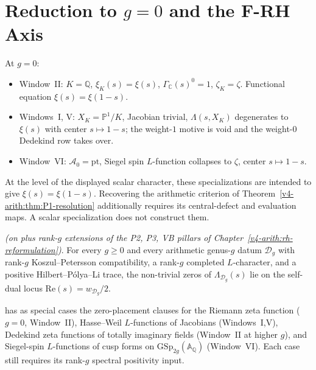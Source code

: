 \section{Reduction to \texorpdfstring{\(g=0\)}{g=0} and the F-RH Axis}
\label{v4-arith:ag:reduction}

At \(g=0\):
\begin{itemize}
\item Window~II: \(K=\mathbb{Q}\), \(\xi_K(s)=\xi(s)\), \(\Gamma_{\mathbb{C}}(s)^0=1\),
\(\zeta_K=\zeta\). Functional equation \(\xi(s)=\xi(1-s)\).
\item Windows~I, V: \(X_K=\mathbb{P}^1/K\), Jacobian trivial, \(\Lambda(s,X_K)\)
degenerates to \(\xi(s)\) with center \(s\mapsto 1-s\); the weight-\(1\) motive
is void and the weight-\(0\) Dedekind row takes over.
\item Window~VI: \(\mathcal{A}_0=\mathrm{pt}\), Siegel spin \(L\)-function
collapses to \(\zeta\), center \(s\mapsto 1-s\).
\end{itemize}

At the level of the displayed scalar character, these specializations
are intended to give \(\xi(s)=\xi(1-s)\).
Recovering the arithmetic criterion of
Theorem~\ref{v4-arith:thm:P1-resolution} additionally requires its
central-defect and evaluation maps. A scalar specialization does not
construct them.

\begin{corollary}
\label{v4-arith:ag:cor:all-genus-FRH}
\ClaimStatusConditional \emph{(on  plus
rank-\(g\) extensions of the P2, P3, VB pillars of
Chapter~\ref{v4-arith:rh-reformulation})}. For every \(g\geq 0\) and every
arithmetic genus-\(g\) datum \(\mathcal{D}_g\) with rank-\(g\) Koszul--Petersson
compatibility, a rank-\(g\) completed \(L\)-character, and a positive
Hilbert--P\'olya--Li trace, the non-trivial
zeros of \(\Lambda_{\mathcal{D}_g}(s)\) lie on the self-dual locus
\(\mathrm{Re}(s)=w_{\mathcal{D}_g}/2\).
\end{corollary}

\begin{remark}[specialisations]
\label{v4-arith:ag:rem:reach}
 has as special cases the
zero-placement clauses for the Riemann zeta function (\(g=0\),
Window~II), Hasse--Weil \(L\)-functions of Jacobians (Windows~I,V),
Dedekind zeta functions of totally imaginary fields (Window~II at
higher \(g\)), and Siegel-spin \(L\)-functions of cusp forms on
\(\mathrm{GSp}_{2g}(\mathbb{A}_{\mathbb{Q}})\) (Window~VI). Each case
still requires its rank-\(g\) spectral positivity input.
\end{remark}

